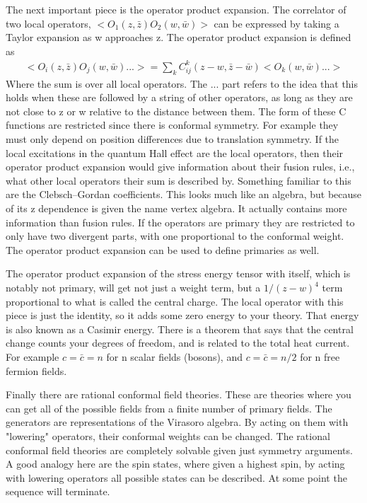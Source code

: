 The next important piece is the operator product expansion. The correlator of two local operators, $<O_1(z,\bar{z})O_2(w,\bar{w})>$ can be expressed by taking a Taylor expansion as w approaches z. The operator product expansion is defined as
\begin{align}
<O_i(z,\bar{z})O_j(w,\bar{w})...> = \sum_k C^k_{ij}(z-w,\bar{z}- \bar{w}) <O_k(w,\bar{w})...>
\end{align}
Where the sum is over all local operators. The ... part refers to the idea that this holds when these are followed by a string of other operators, as long as they are not close to z or w relative to the distance between them. The form of these C functions are restricted since there is conformal symmetry. For example they must only depend on position differences due to translation symmetry. If the local excitations in the quantum Hall effect are the local operators, then their operator product expansion would give information about their fusion rules, i.e., what other local operators their sum is described by. Something familiar to this are the Clebsch–Gordan coefficients. This looks much like an algebra, but because of its z dependence is given the name vertex algebra. It actually contains more information than fusion rules. If the operators are primary they are restricted to only have two divergent parts, with one proportional to the conformal weight. The operator product expansion can be used to define primaries as well.

The operator product expansion of the stress energy tensor with itself, which is notably not primary, will get not just a weight term, but a $1/(z-w)^4$ term proportional to what is called the central charge. The local operator with this piece is just the identity, so it adds some zero energy to your theory. That energy is also known as a Casimir energy. There is a theorem that says that the central change counts your degrees of freedom, and is related to the total heat current. For example $c=\bar{c}=n$ for n scalar fields (bosons), and $c=\bar{c}=n/2$ for n free fermion fields.

Finally there are rational conformal field theories. These are theories where you can get all of the possible fields from a finite number of primary fields. The generators are representations of the Virasoro algebra. By acting on them with "lowering" operators, their conformal weights can be changed. The rational conformal field theories are completely solvable given just symmetry arguments. A good analogy here are the spin states, where given a highest spin, by acting with lowering operators all possible states can be described. At some point the sequence will terminate.


